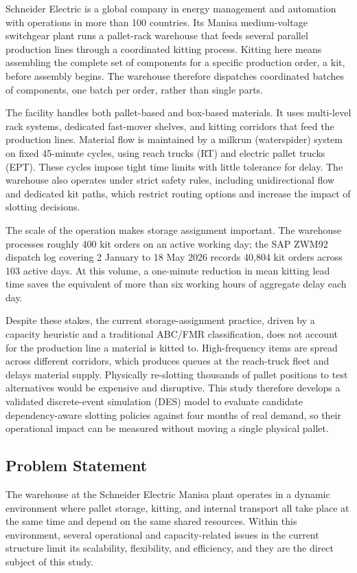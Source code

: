 \documentclass[12pt,a4paper]{article}
\begin{document}
Schneider Electric is a global company in energy management and automation
with operations in more than 100 countries. Its Manisa medium-voltage
switchgear plant runs a pallet-rack warehouse that feeds several parallel
production lines through a coordinated kitting process. Kitting here means
assembling the complete set of components for a specific production order, a
kit, before assembly begins. The warehouse therefore dispatches coordinated
batches of components, one batch per order, rather than single parts.

The facility handles both pallet-based and box-based materials. It uses
multi-level rack systems, dedicated fast-mover shelves, and kitting corridors
that feed the production lines. Material flow is maintained by a milkrun
(waterspider) system on fixed 45-minute cycles, using reach trucks (RT) and
electric pallet trucks (EPT). These cycles impose tight time limits with
little tolerance for delay. The warehouse also operates under strict safety
rules, including unidirectional flow and dedicated kit paths, which restrict
routing options and increase the impact of slotting decisions.

The scale of the operation makes storage assignment important. The warehouse
processes roughly 400 kit orders on an active working day; the SAP ZWM92
dispatch log covering 2 January to 18 May 2026 records 40{,}804 kit orders
across 103 active days. At this volume, a one-minute reduction in mean kitting
lead time saves the equivalent of more than six working hours of aggregate
delay each day.

Despite these stakes, the current storage-assignment practice, driven by a
capacity heuristic and a traditional ABC/FMR classification, does not account
for the production line a material is kitted to. High-frequency items are
spread across different corridors, which produces queues at the reach-truck
fleet and delays material supply. Physically re-slotting thousands of pallet
positions to test alternatives would be expensive and disruptive. This study
therefore develops a validated discrete-event simulation (DES) model to
evaluate candidate dependency-aware slotting policies against four months of
real demand, so their operational impact can be measured without moving a
single physical pallet.

\subsection{Problem Statement}
The warehouse at the Schneider Electric Manisa plant operates in a dynamic
environment where pallet storage, kitting, and internal transport all take
place at the same time and depend on the same shared resources. Within this
environment, several operational and capacity-related issues in the current
structure limit its scalability, flexibility, and efficiency, and they are the
direct subject of this study.
\end{document}
